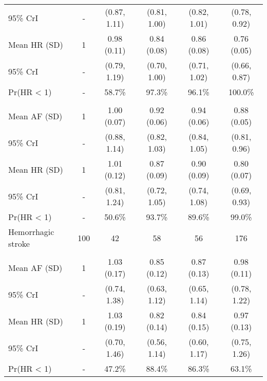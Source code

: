 \documentclass[nutrients,article,submitted,moreauthors,pdftex]{Definitions/mdpi}
\begin{document}
\begin{table}[H]
{\begin{tabular}[t]{lccccc}
\hspace{1em}95\% CrI & - & (0.87, 1.11) & (0.81, 1.00) & (0.82, 1.01) & (0.78, 0.92)\\
\rowcolor{gray!6}  \hspace{1em}Mean HR (SD) & 1 & 0.98 (0.11) & 0.84 (0.08) & 0.86 (0.08) & 0.76 (0.05)\\
\hspace{1em}95\% CrI & - & (0.79, 1.19) & (0.70, 1.00) & (0.71, 1.02) & (0.66, 0.87)\\
\rowcolor{gray!6}  \hspace{1em}Pr(HR < 1) & - & 58.7\% & 97.3\% & 96.1\% & 100.0\%\\
\addlinespace[0.3em]
\multicolumn{6}{l}{\textbf{Model 2}}\\
\hspace{1em}Mean AF (SD) & 1 & 1.00 (0.07) & 0.92 (0.06) & 0.94 (0.06) & 0.88 (0.05)\\
\rowcolor{gray!6}  \hspace{1em}95\% CrI & - & (0.88, 1.14) & (0.82, 1.03) & (0.84, 1.05) & (0.81, 0.96)\\
\hspace{1em}Mean HR (SD) & 1 & 1.01 (0.12) & 0.87 (0.09) & 0.90 (0.09) & 0.80 (0.07)\\
\rowcolor{gray!6}  \hspace{1em}95\% CrI & - & (0.81, 1.24) & (0.72, 1.05) & (0.74, 1.08) & (0.69, 0.93)\\
\hspace{1em}Pr(HR < 1) & - & 50.6\% & 93.7\% & 89.6\% & 99.0\%\\
\hline
\rowcolor{gray!6}  Hemorrhagic stroke & 100 & 42 & 58 & 56 & 176\\
\addlinespace[0.3em]
\multicolumn{6}{l}{\textbf{Model 0}}\\
\hspace{1em}Mean AF (SD) & 1 & 1.03 (0.17) & 0.85 (0.12) & 0.87 (0.13) & 0.98 (0.11)\\
\rowcolor{gray!6}  \hspace{1em}95\% CrI & - & (0.74, 1.38) & (0.63, 1.12) & (0.65, 1.14) & (0.78, 1.22)\\
\hspace{1em}Mean HR (SD) & 1 & 1.03 (0.19) & 0.82 (0.14) & 0.84 (0.15) & 0.97 (0.13)\\
\rowcolor{gray!6}  \hspace{1em}95\% CrI & - & (0.70, 1.46) & (0.56, 1.14) & (0.60, 1.17) & (0.75, 1.26)\\
\hspace{1em}Pr(HR < 1) & - & 47.2\% & 88.4\% & 86.3\% & 63.1\%\\

\end{tabular}}
\end{table}
\end{document}
